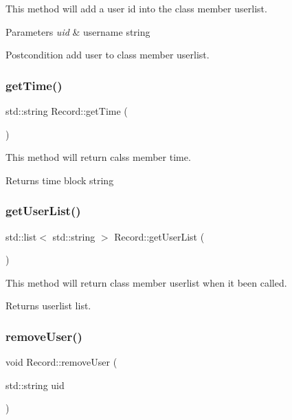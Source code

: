 This method will add a user id into the class member userlist. 
\begin{DoxyParams}{Parameters}
{\em uid} & username string \\
\hline
\end{DoxyParams}
\begin{DoxyPostcond}{Postcondition}
add user to class member userlist. 
\end{DoxyPostcond}
\mbox{\label{class_record_ac34565295efe3cbae2d5204b046aa258}} 
\subsubsection{\texorpdfstring{get\+Time()}{getTime()}}
{\footnotesize\ttfamily std\+::string Record\+::get\+Time (\begin{DoxyParamCaption}{ }\end{DoxyParamCaption})}

This method will return calss member time. \begin{DoxyReturn}{Returns}
time block string 
\end{DoxyReturn}
\mbox{\label{class_record_a79bd038b2a7c898441d8d638013640f9}} 
\subsubsection{\texorpdfstring{get\+User\+List()}{getUserList()}}
{\footnotesize\ttfamily std\+::list$<$ std\+::string $>$ Record\+::get\+User\+List (\begin{DoxyParamCaption}{ }\end{DoxyParamCaption})}

This method will return class member userlist when it been called. \begin{DoxyReturn}{Returns}
userlist list. 
\end{DoxyReturn}
\mbox{\label{class_record_ac52545295427a5923912f0ad4cdc4620}} 
\subsubsection{\texorpdfstring{remove\+User()}{removeUser()}}
{\footnotesize\ttfamily void Record\+::remove\+User (\begin{DoxyParamCaption}\item[{std\+::string}]{uid }\end{DoxyParamCaption})}

